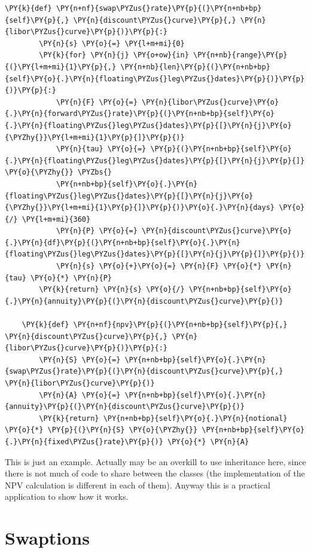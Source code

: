 \begin{tcolorbox}[breakable, size=fbox, boxrule=1pt, pad at break*=1mm,colback=cellbackground, colframe=cellborder]
\begin{Verbatim}[commandchars=\\\{\}]
    \PY{k}{def} \PY{n+nf}{swap\PYZus{}rate}\PY{p}{(}\PY{n+nb+bp}{self}\PY{p}{,} \PY{n}{discount\PYZus{}curve}\PY{p}{,} \PY{n}{libor\PYZus{}curve}\PY{p}{)}\PY{p}{:}
        \PY{n}{s} \PY{o}{=} \PY{l+m+mi}{0}
        \PY{k}{for} \PY{n}{j} \PY{o+ow}{in} \PY{n+nb}{range}\PY{p}{(}\PY{l+m+mi}{1}\PY{p}{,} \PY{n+nb}{len}\PY{p}{(}\PY{n+nb+bp}{self}\PY{o}{.}\PY{n}{floating\PYZus{}leg\PYZus{}dates}\PY{p}{)}\PY{p}{)}\PY{p}{:}
            \PY{n}{F} \PY{o}{=} \PY{n}{libor\PYZus{}curve}\PY{o}{.}\PY{n}{forward\PYZus{}rate}\PY{p}{(}\PY{n+nb+bp}{self}\PY{o}{.}\PY{n}{floating\PYZus{}leg\PYZus{}dates}\PY{p}{[}\PY{n}{j}\PY{o}{\PYZhy{}}\PY{l+m+mi}{1}\PY{p}{]}\PY{p}{)}
            \PY{n}{tau} \PY{o}{=} \PY{p}{(}\PY{n+nb+bp}{self}\PY{o}{.}\PY{n}{floating\PYZus{}leg\PYZus{}dates}\PY{p}{[}\PY{n}{j}\PY{p}{]} \PY{o}{\PYZhy{}} \PYZbs{}
            \PY{n+nb+bp}{self}\PY{o}{.}\PY{n}{floating\PYZus{}leg\PYZus{}dates}\PY{p}{[}\PY{n}{j}\PY{o}{\PYZhy{}}\PY{l+m+mi}{1}\PY{p}{]}\PY{p}{)}\PY{o}{.}\PY{n}{days} \PY{o}{/} \PY{l+m+mi}{360}
            \PY{n}{P} \PY{o}{=} \PY{n}{discount\PYZus{}curve}\PY{o}{.}\PY{n}{df}\PY{p}{(}\PY{n+nb+bp}{self}\PY{o}{.}\PY{n}{floating\PYZus{}leg\PYZus{}dates}\PY{p}{[}\PY{n}{j}\PY{p}{]}\PY{p}{)}
            \PY{n}{s} \PY{o}{+}\PY{o}{=} \PY{n}{F} \PY{o}{*} \PY{n}{tau} \PY{o}{*} \PY{n}{P}
        \PY{k}{return} \PY{n}{s} \PY{o}{/} \PY{n+nb+bp}{self}\PY{o}{.}\PY{n}{annuity}\PY{p}{(}\PY{n}{discount\PYZus{}curve}\PY{p}{)}
	
    \PY{k}{def} \PY{n+nf}{npv}\PY{p}{(}\PY{n+nb+bp}{self}\PY{p}{,} \PY{n}{discount\PYZus{}curve}\PY{p}{,} \PY{n}{libor\PYZus{}curve}\PY{p}{)}\PY{p}{:}
        \PY{n}{S} \PY{o}{=} \PY{n+nb+bp}{self}\PY{o}{.}\PY{n}{swap\PYZus{}rate}\PY{p}{(}\PY{n}{discount\PYZus{}curve}\PY{p}{,} \PY{n}{libor\PYZus{}curve}\PY{p}{)}
        \PY{n}{A} \PY{o}{=} \PY{n+nb+bp}{self}\PY{o}{.}\PY{n}{annuity}\PY{p}{(}\PY{n}{discount\PYZus{}curve}\PY{p}{)}
        \PY{k}{return} \PY{n+nb+bp}{self}\PY{o}{.}\PY{n}{notional} \PY{o}{*} \PY{p}{(}\PY{n}{S} \PY{o}{\PYZhy{}} \PY{n+nb+bp}{self}\PY{o}{.}\PY{n}{fixed\PYZus{}rate}\PY{p}{)} \PY{o}{*} \PY{n}{A}
\end{Verbatim}
\end{tcolorbox}

This is just an example. Actually may be an overkill to use inheritance here, since there is not much of code to share between the classes (the implementation of the NPV calculation is different in each of them).
Anyway this is a practical application to show how it works.

\section{Swaptions}\label{interest-rate-swaptions}

